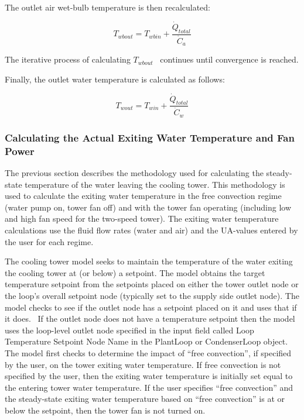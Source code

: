 The outlet air wet-bulb temperature is then recalculated:

\begin{equation}
{T_{wbout}} = {T_{wbin}} + \frac{{{{\dot Q}_{total}}}}{{{{\dot C}_a}}}
\end{equation}

The iterative process of calculating \({T_{wbout}}\) ~continues until convergence is reached.

Finally, the outlet water temperature is calculated as follows:

\begin{equation}
{T_{wout}} = {T_{win}} + \frac{{{{\dot Q}_{total}}}}{{{{\dot C}_w}}}
\end{equation}

\subsubsection{Calculating the Actual Exiting Water Temperature and Fan Power}\label{calculating-the-actual-exiting-water-temperature-and-fan-power}

The previous section describes the methodology used for calculating the steady-state temperature of the water leaving the cooling tower. This methodology is used to calculate the exiting water temperature in the free convection regime (water pump on, tower fan off) and with the tower fan operating (including low and high fan speed for the two-speed tower). The exiting water temperature calculations use the fluid flow rates (water and air) and the UA-values entered by the user for each regime.

The cooling tower model seeks to maintain the temperature of the water exiting the cooling tower at (or below) a setpoint. The model obtains the target temperature setpoint from the setpoints placed on either the tower outlet node or the loop's overall setpoint node (typically set to the supply side outlet node). The model checks to see if the outlet node has a setpoint placed on it and uses that if it does.~ If the outlet node does not have a temperature setpoint then the model uses the loop-level outlet node specified in the input field called Loop Temperature Setpoint Node Name in the PlantLoop or CondenserLoop object. The model first checks to determine the impact of ``free convection'', if specified by the user, on the tower exiting water temperature. If free convection is not specified by the user, then the exiting water temperature is initially set equal to the entering tower water temperature. If the user specifies ``free convection'' and the steady-state exiting water temperature based on ``free convection'' is at or below the setpoint, then the tower fan is not turned on.

